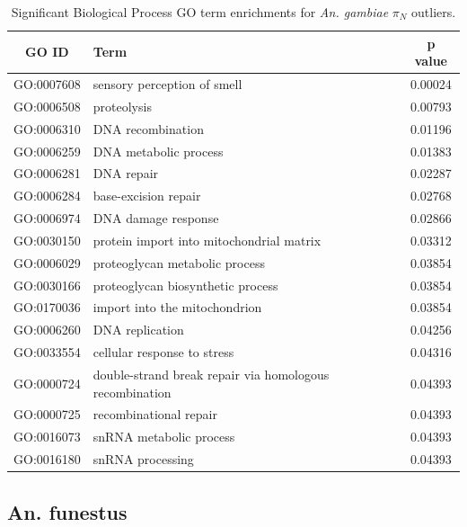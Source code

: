 \begin{table}[H]
    \centering
    \begin{tabular}{clc}
        \toprule
        \textbf{GO ID}& \textbf{Term} & \textbf{p value}\\
        \midrule
        GO:0007608 & sensory perception of smell & 0.00024 \\ 
        GO:0006508 & proteolysis & 0.00793 \\ 
        GO:0006310 & DNA recombination & 0.01196 \\ 
        GO:0006259 & DNA metabolic process & 0.01383 \\ 
        GO:0006281 & DNA repair & 0.02287 \\ 
        GO:0006284 & base-excision repair & 0.02768 \\ 
        GO:0006974 & DNA damage response & 0.02866 \\ 
        GO:0030150 & protein import into mitochondrial matrix & 0.03312 \\ 
        GO:0006029 & proteoglycan metabolic process & 0.03854 \\ 
        GO:0030166 & proteoglycan biosynthetic process & 0.03854 \\ 
        GO:0170036 & import into the mitochondrion & 0.03854 \\ 
        GO:0006260 & DNA replication & 0.04256 \\ 
        GO:0033554 & cellular response to stress & 0.04316 \\ 
        GO:0000724 & double-strand break repair via homologous recombination& 0.04393 \\ 
        GO:0000725 & recombinational repair & 0.04393 \\ 
        GO:0016073 & snRNA metabolic process & 0.04393 \\ 
        GO:0016180 & snRNA processing & 0.04393 \\ \bottomrule
    \end{tabular}
        \caption{Significant Biological Process GO term enrichments for \textit{An. gambiae} $\pi_{N}$ outliers.}
    \label{gambGOpi}
\end{table}

\subsection{An. funestus}

